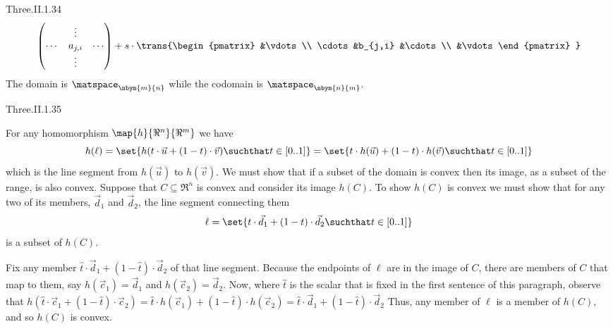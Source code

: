 \begin{ans}{Three.II.1.34}
\begin{align*}
{\begin{pmatrix}
                   &\vdots          \\
            \cdots &a_{j,i} &\cdots \\
                   &\vdots
          \end{pmatrix} }
         +s\cdot\trans{\begin{pmatrix}
                   &\vdots          \\
            \cdots &b_{j,i} &\cdots \\
                   &\vdots
          \end{pmatrix} }
      \end{align*}
      The domain is \( \matspace_{\nbym{m}{n}} \)
      while the codomain is \( \matspace_{\nbym{n}{m}} \).
     
\end{ans}
\begin{ans}{Three.II.1.35}
      \begin{exparts}
        \partsitem  For any homomorphism \( \map{h}{\Re^n}{\Re^m} \) we have
          \begin{equation*}
            h(\ell)
            =\set{h(t\cdot\vec{u}+(1-t)\cdot\vec{v})\suchthat t\in [0..1]}
            =\set{t\cdot h(\vec{u})+(1-t)\cdot h(\vec{v})\suchthat t\in [0..1]}
          \end{equation*}
          which is the line segment from $h(\vec{u})$ to $h(\vec{v})$.
        \partsitem We must show that if a subset of the domain is convex then
          its image, as a subset of the range, is also convex.
          Suppose that \( C\subseteq \Re^n \) is convex
          and consider its image $h(C)$.
          To show $h(C)$ is convex we must show that for any two of its
          members, $\vec{d}_1$ and $\vec{d}_2$,
          the line segment connecting them
          \begin{equation*}
            \ell=\set{t\cdot\vec{d}_1+(1-t)\cdot\vec{d}_2\suchthat t\in [0..1]}
          \end{equation*}
          is a subset of $h(C)$.

          Fix any member $\hat{t}\cdot\vec{d}_1+(1-\hat{t})\cdot\vec{d}_2$
          of that line segment.
          Because the endpoints of $\ell$ are in the image of $C$, there are
          members of $C$ that map to them, say $h(\vec{c}_1)=\vec{d}_1$
          and $h(\vec{c}_2)=\vec{d}_2$.
          Now, where $\hat{t}$ is the scalar that is fixed in the first
          sentence of this paragraph, observe that
          $h(\hat{t}\cdot\vec{c}_1+(1-\hat{t})\cdot\vec{c}_2)
          =\hat{t}\cdot h(\vec{c}_1)+(1-\hat{t})\cdot h(\vec{c}_2)
          =\hat{t}\cdot\vec{d}_1+(1-\hat{t})\cdot\vec{d}_2$
          Thus, any member of $\ell$ is a member of $h(C)$, and so $h(C)$ is
          convex.
      \end{exparts}
    
\end{ans}

